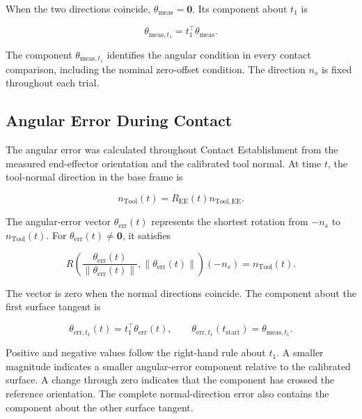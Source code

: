 When the two directions coincide, \mbox{\(\theta_{\mathrm{meas}}=\mathbf{0}\)}.
Its component about \mbox{\(t_1\)} is

\begin{equation}
\theta_{\mathrm{meas},t_1}=t_1^\top\theta_{\mathrm{meas}}.
\label{eq:pose_based_initial_deviation}
\end{equation}

The component \mbox{\(\theta_{\mathrm{meas},t_1}\)} identifies the angular
condition in every contact comparison, including the nominal zero-offset
condition. The direction \mbox{\(n_s\)} is fixed throughout each trial.

\subsection{Angular Error During Contact}
\label{subsec:experimental_supporting_metrics}

The angular error was calculated throughout Contact Establishment from the
measured end-effector orientation and the calibrated tool normal.
At time \mbox{\(t\)}, the tool-normal direction in the base frame is

\begin{equation}
n_{\mathrm{Tool}}(t)=R_{\mathrm{EE}}(t)n_{\mathrm{Tool,EE}}.
\label{eq:measured_tool_normal_time}
\end{equation}

The angular-error vector \mbox{\(\theta_{\mathrm{err}}(t)\)} represents the
shortest rotation from \mbox{\(-n_s\)} to \mbox{\(n_{\mathrm{Tool}}(t)\)}.
For \mbox{\(\theta_{\mathrm{err}}(t)\neq\mathbf{0}\)}, it satisfies

\begin{equation}
R\left(\frac{\theta_{\mathrm{err}}(t)}{\lVert\theta_{\mathrm{err}}(t)\rVert},
\lVert\theta_{\mathrm{err}}(t)\rVert\right)(-n_s)
=n_{\mathrm{Tool}}(t).
\label{eq:angular_error_rotation}
\end{equation}

The vector is zero when the normal directions coincide.
The component about the first surface tangent is

\begin{equation}
\theta_{\mathrm{err},t_1}(t)=t_1^\top\theta_{\mathrm{err}}(t),
\qquad
\theta_{\mathrm{err},t_1}(t_{\mathrm{start}})
=\theta_{\mathrm{meas},t_1}.
\label{eq:surface_resolved_angular_error}
\end{equation}

Positive and negative values follow the right-hand rule about \mbox{\(t_1\)}.
A smaller magnitude indicates a smaller angular-error component relative to
the calibrated surface. A change through zero indicates that the component
has crossed the reference orientation. The complete normal-direction error
also contains the component about the other surface tangent.

